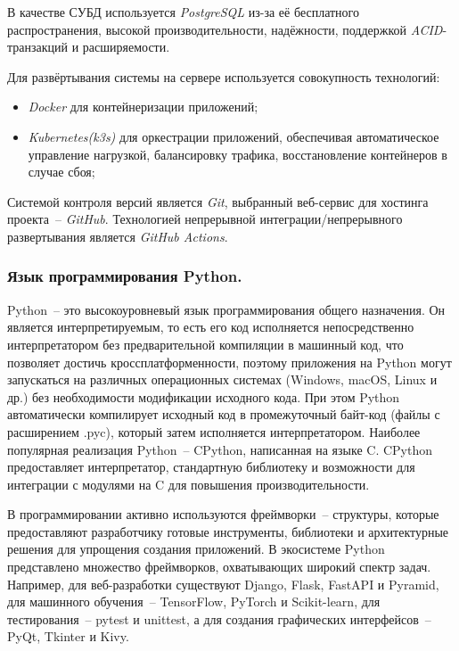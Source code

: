 В качестве СУБД используется \textit{PostgreSQL} из-за её бесплатного распространения, высокой производительности, надёжности, поддержкой \textit{ACID}-транзакций и расширяемости.

Для развёртывания системы на сервере используется совокупность технологий:

\begin{itemize}
    \item \textit{Docker} для контейнеризации приложений;
    \item \textit{Kubernetes(k3s)} для оркестрации приложений, обеспечивая автоматическое управление нагрузкой, балансировку трафика, восстановление контейнеров в случае сбоя;
\end{itemize}

Системой контроля версий является \textit{Git}, выбранный веб-сервис для хостинга проекта~-- \textit{GitHub}. Технологией непрерывной интеграции/непрерывного развертывания является \textit{GitHub Actions}.


\iffalse

\subsubsection{Язык программирования Python. }

Python~-- это высокоуровневый язык программирования общего назначения. Он является интерпретируемым, то есть его код исполняется непосредственно интерпретатором без предварительной компиляции в машинный код, что позволяет достичь кроссплатформенности, поэтому приложения на Python могут запускаться на различных операционных системах (Windows, macOS, Linux и др.) без необходимости модификации исходного кода. При этом Python автоматически компилирует исходный код в промежуточный байт-код (файлы с расширением .pyc), который затем исполняется интерпретатором. Наиболее популярная реализация Python~-- CPython, написанная на языке C. CPython предоставляет интерпретатор, стандартную библиотеку и возможности для интеграции с модулями на C для повышения производительности.

В программировании активно используются фреймворки~-- структуры, которые предоставляют разработчику готовые инструменты, библиотеки и архитектурные решения для упрощения создания приложений. В экосистеме Python представлено множество фреймворков, охватывающих широкий спектр задач. Например, для веб-разработки существуют Django, Flask, FastAPI и Pyramid, для машинного обучения~-- TensorFlow, PyTorch и Scikit-learn, для тестирования~-- pytest и unittest, а для создания графических интерфейсов~-- PyQt, Tkinter и Kivy.

